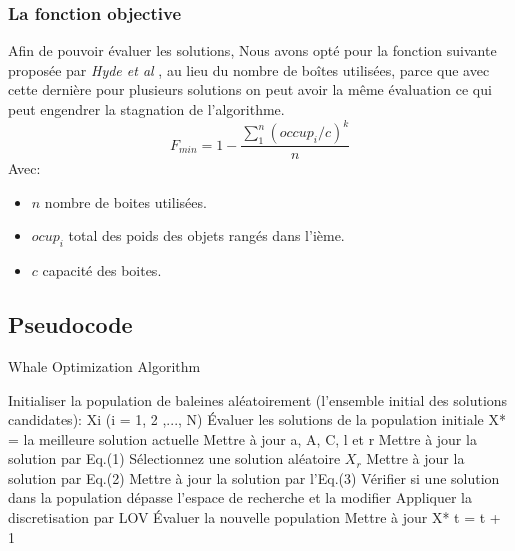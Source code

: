 \documentclass[12pt]{article}
\begin{document}
\subsubsection{La fonction objective }
Afin de pouvoir évaluer les solutions, Nous avons opté pour la fonction suivante proposée par \emph{Hyde et al} \cite{hyde2009hyflex}, au lieu du nombre de boîtes utilisées, parce que avec cette dernière pour plusieurs solutions on peut avoir la même évaluation ce qui peut engendrer la stagnation de l’algorithme.
\[ F_{min} = 1 - \frac{\sum_{1}^{n} (occup_i / c)^k}{n}\]
Avec:
\begin{itemize}
    \item \(n\) nombre de boites utilisées.
    \item \(ocup_i\) total des poids des objets rangés dans l’ième.
    \item \(c\) capacité des boites.
    
\end{itemize}
\subsection{Pseudocode}
\begin{algorithm}[H]
    \caption{Whale Optimization Algorithm}
    \begin{algorithmic}
        \STATE Initialiser la population de baleines aléatoirement (l'ensemble initial des solutions candidates): Xi (i = 1, 2 ,..., N)\;
        \STATE Évaluer les solutions de la population initiale\;
        \STATE X* = la meilleure solution actuelle\;
                \STATE Mettre à jour a, A, C, l et r\;
                        \STATE Mettre à jour la solution par Eq.(1)\;
                    \ELSE
                        \STATE Sélectionnez une solution aléatoire \(X_r\)\;
                        \STATE Mettre à jour la solution par Eq.(2)\;
                    \ENDIF
                \ELSE 
                    \STATE Mettre à jour la solution par l'Eq.(3)\;
                \ENDIF
            \ENDFOR
            \STATE Vérifier si une solution dans la population dépasse l'espace de recherche et la modifier\;
            \STATE Appliquer la discretisation par LOV\;
            \STATE Évaluer la nouvelle population\;
            \STATE Mettre à jour X* \;
            \STATE t = t + 1\;
        \ENDWHILE
    \end{algorithmic}
\end{algorithm}
\end{document}
